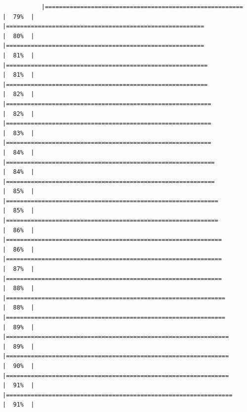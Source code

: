 \documentclass[
]{article}
\begin{document}
\begin{verbatim}
           |========================================================              |  79%  |                                                                              |========================================================              |  80%  |                                                                              |========================================================              |  81%  |                                                                              |=========================================================             |  81%  |                                                                              |=========================================================             |  82%  |                                                                              |==========================================================            |  82%  |                                                                              |==========================================================            |  83%  |                                                                              |==========================================================            |  84%  |                                                                              |===========================================================           |  84%  |                                                                              |===========================================================           |  85%  |                                                                              |============================================================          |  85%  |                                                                              |============================================================          |  86%  |                                                                              |=============================================================         |  86%  |                                                                              |=============================================================         |  87%  |                                                                              |=============================================================         |  88%  |                                                                              |==============================================================        |  88%  |                                                                              |==============================================================        |  89%  |                                                                              |===============================================================       |  89%  |                                                                              |===============================================================       |  90%  |                                                                              |===============================================================       |  91%  |                                                                              |================================================================      |  91%  |                                                                    
\end{verbatim}
\end{document}
